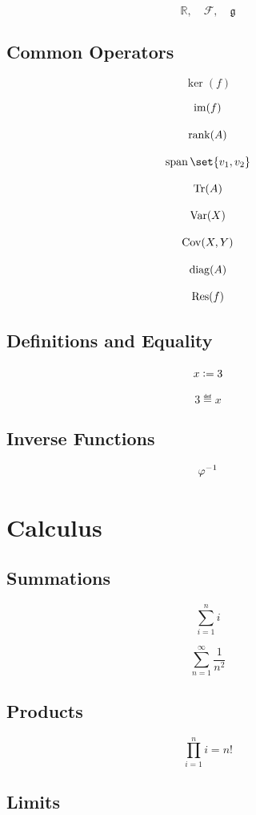 \documentclass{article}
\begin{document}
\[
    \mathbb{R},\quad
    \mathcal{F},\quad
    \mathfrak{g}
\]

\subsection{Common Operators}

\[
    \ker(f)
\]

\[
    \operatorname{im}(f)
\]

\[
    \operatorname{rank}(A)
\]

\[
    \Span\set{v_1,v_2}
\]

\[
    \operatorname{Tr}(A)
\]

\[
    \operatorname{Var}(X)
\]

\[
    \operatorname{Cov}(X,Y)
\]

\[
    \operatorname{diag}(A)
\]

\[
    \operatorname{Res}(f)
\]

\subsection{Definitions and Equality}

\[
    x\vcentcolon= 3
\]

\[
    3\eqdef x
\]

\subsection{Inverse Functions}

\[
    \varphi^{-1}
\]


\section{Calculus}

\subsection{Summations}

\[
    \sum_{i=1}^{n}i
\]

\[
    \sum_{n=1}^{\infty}\frac{1}{n^2}
\]

\subsection{Products}

\[
    \prod_{i=1}^{n}i=n!
\]

\subsection{Limits}
\end{document}

